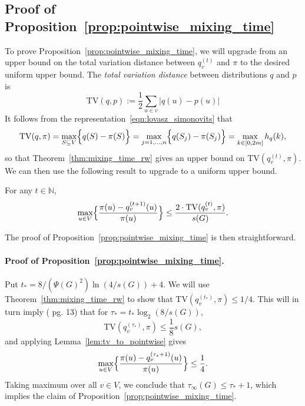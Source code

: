 \subsection{Proof of Proposition~\ref{prop:pointwise_mixing_time}}
\label{subsec:pf_prop_pointwise_mixing_time}
To prove Proposition~\ref{prop:pointwise_mixing_time}, we will upgrade from an upper bound on the total variation distance between $q_v^{(t)}$ and $\pi$ to the desired uniform upper bound. The \emph{total variation distance} between distributions $q$ and $p$ is
\begin{equation*}
\mathrm{TV}(q,p) := \frac{1}{2}\sum_{u \in v} \bigl|q(u) - p(u)\bigr|
\end{equation*}
It follows from the representation~\eqref{eqn:lovasz_simonovits} that
\begin{equation*}
\mathrm{TV}(q,\pi) = \max_{S \subseteq V} \Bigl\{q(S) - \pi(S)\Bigr\} = \max_{j = 1,\ldots,n} \Bigl\{q(S_j) - \pi(S_j)\Bigr\} = \max_{k \in [0,2m]} h_q(k),
\end{equation*}
so that Theorem~\ref{thm:mixing_time_rw} gives an upper bound on $\mathrm{TV}(q_v^{(t)},\pi)$. We can then use the following result to upgrade to a uniform upper bound.

\begin{lemma}
	\label{lem:tv_to_pointwise}
	For any $t \in \mathbb{N}$,
	\begin{equation*}
	\max_{u \in V} \Bigl\{\frac{\pi(u) - q_v^{(t + 1)}(u)}{\pi(u)}\Bigr\} \leq \frac{2 \cdot \mathrm{TV}(q_v^{(t)}, \pi)}{s(G)}.
	\end{equation*}
\end{lemma}

The proof of Proposition~\ref{prop:pointwise_mixing_time} is then straightforward.
\paragraph{Proof of Proposition~\ref{prop:pointwise_mixing_time}.}
	Put $t_{\ast} = 8/(\Psi(G)^2) \ln(4/s(G)) + 4$. We will use Theorem~\ref{thm:mixing_time_rw} to show that $\mathrm{TV}(q_v^{(t_{\ast})},\pi) \leq 1/4$. This will in turn imply (\cite{montenegro2002} pg. 13) that for $\tau_{\ast} = t_{\ast} \log_2(8/s(G))$,
	\begin{equation*}
	\mathrm{TV}(q_v^{(\tau_{\ast})},\pi) \leq \frac{1}{8}s(G),
	\end{equation*}
	and applying Lemma~\ref{lem:tv_to_pointwise} gives
	\begin{equation*}
	\max_{u \in V} \Bigl\{\frac{\pi(u) - q_v^{(\tau_{\ast} + 1)}(u)}{\pi(u)}\Bigr\} \leq \frac{1}{4}.
	\end{equation*}
	Taking maximum over all $v \in V$, we conclude that $\tau_{\infty}(G) \leq \tau_{\ast} + 1$, which implies the claim of Proposition~\ref{prop:pointwise_mixing_time}.
	

